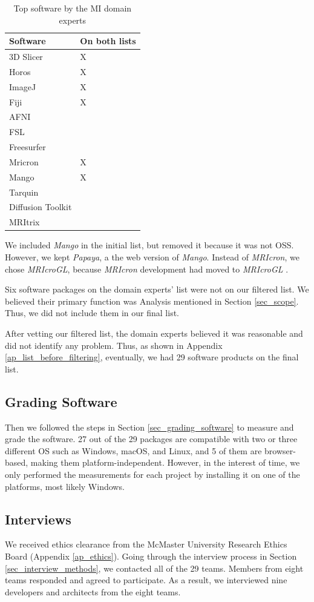 \begin{table}[H]
\centering
\begin{tabular}{ll}
\hline
Software & On both lists \\ \hline
3D Slicer & X \\
Horos & X \\
ImageJ & X \\
Fiji & X \\
AFNI &  \\
FSL &  \\
Freesurfer &  \\
Mricron & X \\
Mango & X \\
Tarquin &  \\
Diffusion Toolkit &  \\
MRItrix &  \\ \hline
\end{tabular}
\caption{\label{tab_top_software_experts}Top software by the MI domain experts}
\end{table}

We included \textit{Mango} in the initial list, but removed it because it was not OSS. However, we kept \textit{Papaya}, a the web version of \textit{Mango}. Instead of \textit{MRIcron}, we chose \textit{MRIcroGL}, because \textit{MRIcron} development had moved to
\textit{MRIcroGL} \cite{Rorden2021b}.

Six software packages on the domain experts' list were not on our filtered list. We believed their primary function was Analysis mentioned in Section \ref{sec_scope}. Thus, we did not include them in our final list.

After vetting our filtered list, the domain experts believed it was reasonable and did not identify any problem. Thus, as shown in Appendix \ref{ap_list_before_filtering}, eventually, we had 29 software products on the final list. 

\subsection{Grading Software}
\label{sec_applying_method_grading}
Then we followed the steps in Section \ref{sec_grading_software} to measure and grade the software. 27 out of the 29 packages are compatible with two or three different OS such as Windows, macOS, and Linux, and 5 of them are browser-based, making them platform-independent. However, in the interest of time, we only performed the measurements for each project by installing it on one of the platforms, most likely Windows.

\subsection{Interviews}
\label{sec_apply_to_mi_interviews}
We received ethics clearance from the McMaster University Research Ethics Board (Appendix \ref{ap_ethics}). Going through the interview process in Section \ref{sec_interview_methods}, we contacted all of the 29 teams. Members from eight teams responded and agreed to participate. As a result, we interviewed nine developers and architects from the eight teams.
